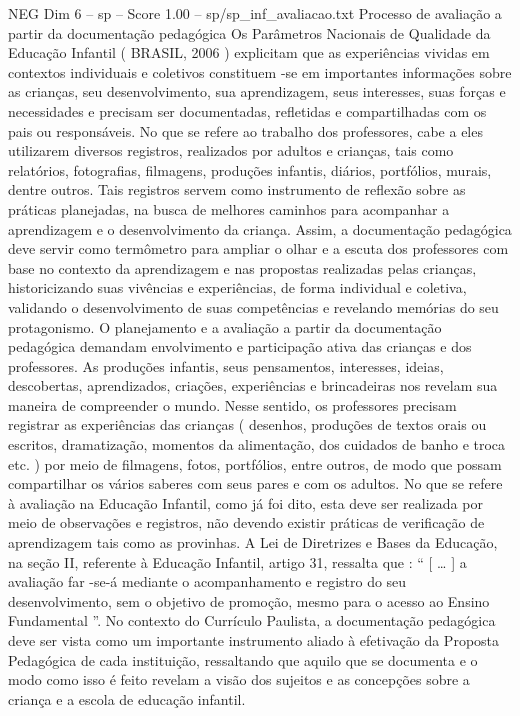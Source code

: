 \begin{textsample}{NEG Dim 6 – sp – Score 1.00 – sp/sp\_inf\_avaliacao.txt}  \label{ex:f6_neg_206}
Processo de avaliação a partir da documentação pedagógica Os Parâmetros Nacionais de Qualidade da Educação Infantil ( BRASIL, 2006 ) explicitam que as experiências vividas em contextos individuais e coletivos constituem -se em importantes informações sobre as crianças, seu desenvolvimento, sua aprendizagem, seus interesses, suas forças e necessidades e precisam ser documentadas, refletidas e compartilhadas com os pais ou responsáveis.
No que se refere ao trabalho dos professores, cabe a eles utilizarem diversos registros, realizados por adultos e crianças, tais como relatórios, fotografias, filmagens, produções infantis, diários, portfólios, murais, dentre outros.
Tais registros servem como instrumento de reflexão sobre as práticas planejadas, na busca de melhores caminhos para acompanhar a aprendizagem e o desenvolvimento da criança.
Assim, a documentação pedagógica deve servir como termômetro para ampliar o olhar e a escuta dos professores com base no contexto da aprendizagem e nas propostas realizadas pelas crianças, historicizando suas vivências e experiências, de forma individual e coletiva, validando o desenvolvimento de suas competências e revelando memórias do seu protagonismo.
O planejamento e a avaliação a partir da documentação pedagógica demandam envolvimento e participação ativa das crianças e dos professores.
As produções infantis, seus pensamentos, interesses, ideias, descobertas, aprendizados, criações, experiências e brincadeiras nos revelam sua maneira de compreender o mundo.
Nesse sentido, os professores precisam registrar as experiências das crianças ( desenhos, produções de textos orais ou escritos, dramatização, momentos da alimentação, dos cuidados de banho e troca etc. ) por meio de filmagens, fotos, portfólios, entre outros, de modo que possam compartilhar os vários saberes com seus pares e com os adultos.
No que se refere à avaliação na Educação Infantil, como já foi dito, esta deve ser realizada por meio de observações e registros, não devendo existir práticas de verificação de aprendizagem tais como as provinhas.
A Lei de Diretrizes e Bases da Educação, na seção II, referente à Educação Infantil, artigo 31, ressalta que : “ [ … ] a avaliação far -se-á mediante o acompanhamento e registro do seu desenvolvimento, sem o objetivo de promoção, mesmo para o acesso ao Ensino Fundamental ”.
No contexto do Currículo Paulista, a documentação pedagógica deve ser vista como um importante instrumento aliado à efetivação da Proposta Pedagógica de cada instituição, ressaltando que aquilo que se documenta e o modo como isso é feito revelam a visão dos sujeitos e as concepções sobre a criança e a escola de educação infantil.

\end{textsample}
